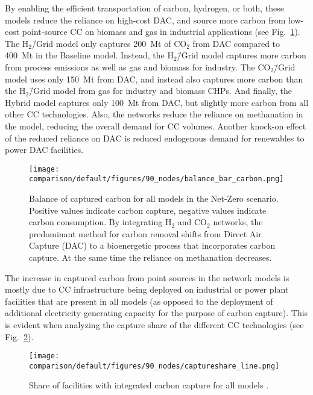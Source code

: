 \documentclass[twocolumn]{article}
\newcommand{\COtwo}{CO$_2$}
\newcommand{\Htwo}{H$_2$}
\newcommand{\modBase}{Baseline model}
\newcommand{\modCO}{CO$_2$\=/Grid model}
\newcommand{\modH}{H$_2$\=/Grid model}
\newcommand{\modHybrid}{Hybrid model}
\begin{document}
By enabling the efficient transportation of carbon, hydrogen, or both, these models reduce the reliance on high-cost DAC, and source more carbon from low-cost point-source CC on biomass and gas in industrial applications (see Fig.~\ref{fig:balance_captured_carbon}). The \modH{} only captures \label{}200~Mt of \COtwo{} from DAC compared to \label{}400~Mt in the \modBase{}. Instead, the \modH{} captures more carbon from process emissions as well as gas and biomass for industry. The \modCO{} uses only \label{}150~Mt from DAC, and instead also captures more carbon than the \modH{} from gas for industry and biomass CHPs. And finally, the \modHybrid{} captures only \label{}100~Mt from DAC, but slightly more carbon from all other CC technologies.
Also, the networks reduce the reliance on methanation in the model, reducing the overall demand for CC volumes. Another knock-on effect of the reduced reliance on DAC is reduced endogenous demand for renewables to power DAC facilities.


\begin{figure}[ht!]
    \centering
    \texttt{[image: comparison/default/figures/90\_nodes/balance\_bar\_carbon.png]}
    \caption{Balance of captured carbon for all models in the Net-Zero scenario. Positive values indicate carbon capture, negative values indicate carbon consumption. By integrating \Htwo{} and \COtwo{} networks, the predominant method for carbon removal shifts from Direct Air Capture (DAC) to a bioenergetic process that incorporates carbon capture. At the same time the reliance on methanation decreases.}
    \label{fig:balance_captured_carbon}
\end{figure}



The increase in captured carbon from point sources in the network models is mostly due to CC infrastructure being deployed on industrial or power plant facilities that are present in all models (as opposed to the deployment of additional electricity generating capacity for the purpose of carbon capture). This is evident when analyzing the capture share of the different CC technologies (see Fig.~\ref{fig:captureshare_line}).


\begin{figure}[h]
    \centering
    \texttt{[image: comparison/default/figures/90\_nodes/captureshare\_line.png]}
    \caption{Share of facilities with integrated carbon capture for all models .}
    \label{fig:captureshare_line}
\end{figure}%
\end{document}
